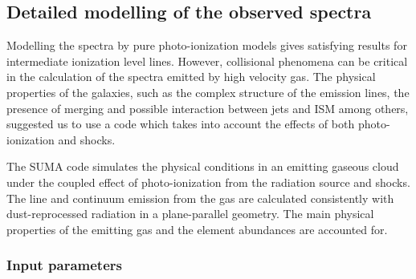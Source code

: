 \documentclass[../main.tex]{subfiles}
\begin{document}
\subsection{Detailed modelling of the observed spectra}
\label{sec:models}





Modelling the spectra by pure photo-ionization models gives satisfying results for intermediate ionization level lines.
However, collisional phenomena can be critical in the calculation of the spectra emitted by high velocity gas.
The physical properties of the galaxies, such as the complex structure of the emission lines, the presence of merging and possible interaction between jets and ISM among others, suggested us to use a code which takes into account the effects of both photo-ionization and shocks.

The SUMA code \citep[][and references therein]{Contini15} simulates the physical conditions in an emitting gaseous cloud under the coupled effect of photo-ionization from the radiation source and shocks. The line and continuum emission from the gas are calculated consistently with dust-reprocessed radiation in a plane-parallel geometry.
The main physical properties of the emitting gas and the element abundances are accounted for.

\subsubsection{Input parameters}
\end{document}
